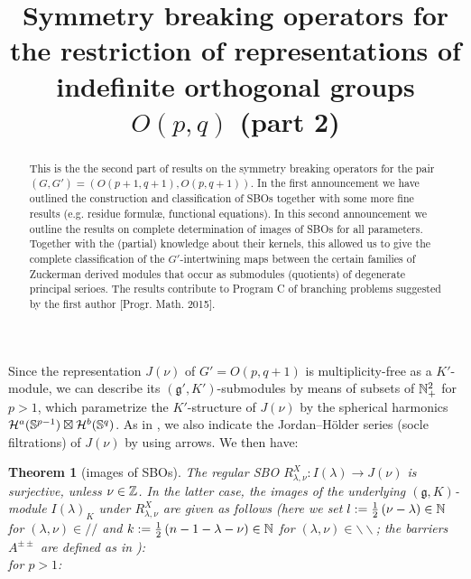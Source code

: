 \documentclass[reqno,12pt]{pja00} %
\newtheorem{theorem}{Theorem}[section]
\theoremstyle{definition}
\theoremstyle{exampstyle} \newtheorem{examp}[theorem]{Theorem}
\begin{document}
\title{Symmetry breaking operators for the restriction of representations of indefinite orthogonal groups $O(p,q)$ (part 2)}

  \maketitle
\begin{abstract}
This is the the second part of results on the symmetry breaking operators for the pair $(G, G') =(O(p+1, q+1), O(p,q+1))$.
In the first announcement we have outlined the construction and classification of SBOs together with some more fine results
(e.g. residue formul\ae, functional equations). In this second announcement we outline the results on complete determination of
images of SBOs for all parameters. Together with the (partial) knowledge about their kernels, this allowed us to give the complete classification
of the $G'$-intertwining maps between the certain families of Zuckerman derived modules that occur as submodules (quotients) of degenerate principal serioes.
The results contribute to Program C of branching problems suggested by the first author [Progr. Math. 2015].
\end{abstract}
	Since the representation $J(\nu)$ of $G'=O(p,q+1)$ is multiplicity-free as a $K'$-module, we can describe its $(\mathfrak{g}',K')$-submodules by means of subsets of $\mathbb{N}_{+}^2$
	for $p>1$, which parametrize the $K'$-structure of $J(\nu)$ by the spherical harmonics $\mathcal{H}^a(\mathbb{S}^{p-1})\boxtimes\mathcal{H}^b(\mathbb{S}^q)$.
	As in \cite{howe1993homogeneous}, we also indicate the Jordan--H\"older series (socle filtrations) of $J(\nu)$ by using arrows.
	We then have:
\begin{theorem}[images of SBOs]
	The regular SBO $R_{\lambda,\nu}^X:I(\lambda)\to J(\nu)$ is surjective,
	unless $\nu\in\mathbb{Z}$. In the latter case, the images of the underlying $(\mathfrak{g},K)$-module $I(\lambda)_K$ under
	$R_{\lambda,\nu}^X$ are given as follows (here we set $l:=\frac{1}{2}\left( \nu-\lambda \right)\in\mathbb{N}$ for $(\lambda,\nu)\in//$ and $k:=\frac{1}{2}\left( n-1-\lambda-\nu \right)
	\in\mathbb{N}$ for
	$(\lambda,\nu)\in\backslash\backslash$; the barriers $A^{\pm\pm}$ are defined as in \cite{howe1993homogeneous}): \\
	for $p>1$:
\end{theorem}
\end{document}

